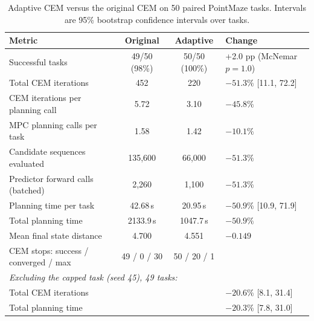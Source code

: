 \documentclass[11pt]{article}
\begin{document}
\begin{table}[H]
  \centering
  \caption{Adaptive CEM versus the original CEM on 50 paired PointMaze tasks.
  Intervals are 95\% bootstrap confidence intervals over tasks.}
  \label{tab:acem}
  \small
  \begin{tabular}{lccl}
    \toprule
    \textbf{Metric} & \textbf{Original} & \textbf{Adaptive} & \textbf{Change} \\
    \midrule
    Successful tasks & 49/50 (98\%) & 50/50 (100\%) & +2.0 pp (McNemar $p=1.0$) \\
    Total CEM iterations & 452 & 220 & $-51.3\%$ [11.1, 72.2] \\
    CEM iterations per planning call & 5.72 & 3.10 & $-45.8\%$ \\
    MPC planning calls per task & 1.58 & 1.42 & $-10.1\%$ \\
    Candidate sequences evaluated & 135{,}600 & 66{,}000 & $-51.3\%$ \\
    Predictor forward calls (batched) & 2{,}260 & 1{,}100 & $-51.3\%$ \\
    Planning time per task & 42.68\,s & 20.95\,s & $-50.9\%$ [10.9, 71.9] \\
    Total planning time & 2133.9\,s & 1047.7\,s & $-50.9\%$ \\
    Mean final state distance & 4.700 & 4.551 & $-0.149$ \\
    CEM stops: success / converged / max & 49 / 0 / 30 & 50 / 20 / 1 & \\
    \midrule
    \multicolumn{4}{l}{\textit{Excluding the capped task (seed 45), 49 tasks:}} \\
    Total CEM iterations & & & $-20.6\%$ [8.1, 31.4] \\
    Total planning time & & & $-20.3\%$ [7.8, 31.0] \\
    \bottomrule
  \end{tabular}
\end{table}
\end{document}
